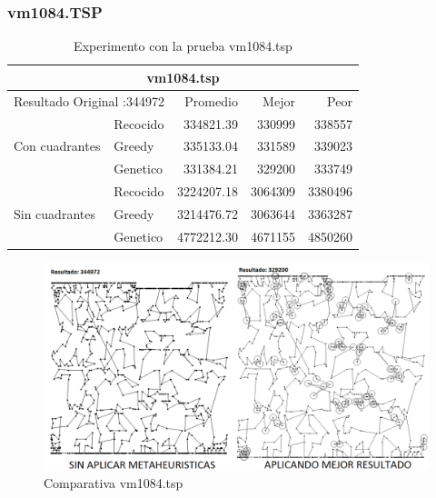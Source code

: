 \subsubsection{vm1084.TSP}
\begin{table}[hbtp]
 \centering 
	\begin{tabular}{ | l   l | r | r | r |   }
         \hline\multicolumn{5}{|c|}{ \rowcolor[gray]{0.8}vm1084.tsp} \\\hline
         \multicolumn{2}{|l|}{Resultado Original :344972}  & Promedio & Mejor & Peor \\ \hline
                        & Recocido  & 334821.39 & 330999 & 338557  \\ 
         Con cuadrantes & Greedy    & 335133.04 & 331589 & 339023  \\ 
                        & Genetico  & 331384.21 & 329200 & 333749  \\ \hline
                        & Recocido  & 3224207.18 & 3064309 & 3380496   \\ 
         Sin cuadrantes & Greedy    & 3214476.72 & 3063644 & 3363287   \\ 
                        & Genetico  & 4772212.30 & 4671155 & 4850260   \\ \hline
    \end{tabular}
    \caption{Experimento con la prueba vm1084.tsp}
    \label{table:EXP_vm1084.tsp}
\end{table}
\begin{figure}[hbtp]
    \centering
        \includegraphics[width=1\textwidth]{PruebasResultados/Experimentos_Comparativas/vm1084.png}
        \caption{Comparativa vm1084.tsp}
        \label{fig:vm1084_comparativa.png}
\end{figure}
